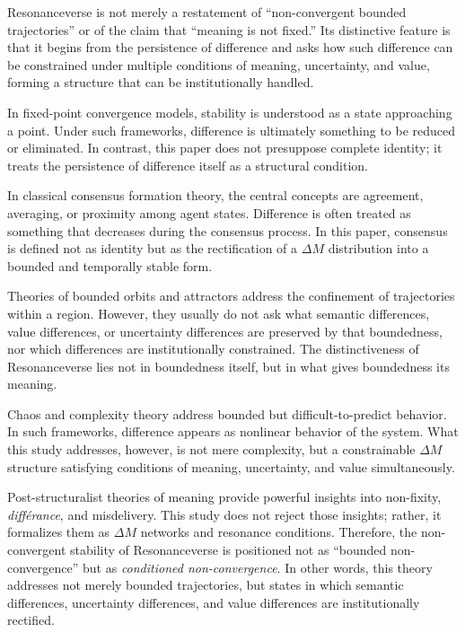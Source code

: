\documentclass[11pt,a4paper]{article}
\theoremstyle{definition}
\begin{document}
Resonanceverse is not merely a restatement of ``non-convergent bounded trajectories'' or of the claim that ``meaning is not fixed.'' Its distinctive feature is that it begins from the persistence of difference and asks how such difference can be constrained under multiple conditions of meaning, uncertainty, and value, forming a structure that can be institutionally handled.

In fixed-point convergence models, stability is understood as a state approaching a point. Under such frameworks, difference is ultimately something to be reduced or eliminated. In contrast, this paper does not presuppose complete identity; it treats the persistence of difference itself as a structural condition.

In classical consensus formation theory, the central concepts are agreement, averaging, or proximity among agent states. Difference is often treated as something that decreases during the consensus process. In this paper, consensus is defined not as identity but as the rectification of a $\Delta M$ distribution into a bounded and temporally stable form.

Theories of bounded orbits and attractors address the confinement of trajectories within a region. However, they usually do not ask what semantic differences, value differences, or uncertainty differences are preserved by that boundedness, nor which differences are institutionally constrained. The distinctiveness of Resonanceverse lies not in boundedness itself, but in what gives boundedness its meaning.

Chaos and complexity theory address bounded but difficult-to-predict behavior. In such frameworks, difference appears as nonlinear behavior of the system. What this study addresses, however, is not mere complexity, but a constrainable $\Delta M$ structure satisfying conditions of meaning, uncertainty, and value simultaneously.

Post-structuralist theories of meaning provide powerful insights into non-fixity, \textit{différance}, and misdelivery. This study does not reject those insights; rather, it formalizes them as $\Delta M$ networks and resonance conditions. Therefore, the non-convergent stability of Resonanceverse is positioned not as ``bounded non-convergence'' but as \textit{conditioned non-convergence}. In other words, this theory addresses not merely bounded trajectories, but states in which semantic differences, uncertainty differences, and value differences are institutionally rectified.
\end{document}

